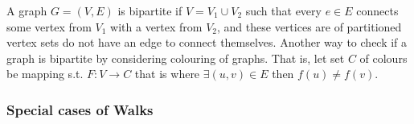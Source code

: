 \documentclass[a4paper]{article}
\theoremstyle{plain}
\theoremstyle{definition}
\newtheorem{defn}{Definition}[section]
\theoremstyle{remark}
\begin{document}
 \begin{tcolorbox}[colback=black!3!white,colframe=black!60!white,title=\begin{defn}Bipartite Graph \label{Bipartite Graph}\end{defn}]
 A graph $G=(V,E)$ is bipartite if $V=V_1 \cup V_2$ such that every $e \in E$ connects some vertex from $V_1$ with a vertex from $V_2$, and these vertices are of partitioned vertex sets do not have an edge to connect themselves. Another way to check if a graph is bipartite by considering colouring of graphs. That is, let set $C$ of colours be mapping s.t. $F:V \to C$ that is where $\exists  (u,v) \in E$ then $f(u) \neq f(v)$. 
 \end{tcolorbox}
\subsubsection{Special cases of Walks}
\end{document}

